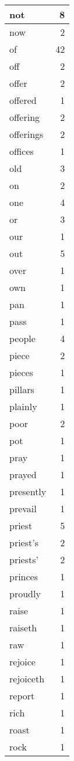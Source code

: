\begin{center}
\begin{longtable}{l|r}
not & 8 \\ \hline
now & 2 \\ \hline
of & 42 \\ \hline
off & 2 \\ \hline
offer & 2 \\ \hline
offered & 1 \\ \hline
offering & 2 \\ \hline
offerings & 2 \\ \hline
offices & 1 \\ \hline
old & 3 \\ \hline
on & 2 \\ \hline
one & 4 \\ \hline
or & 3 \\ \hline
our & 1 \\ \hline
out & 5 \\ \hline
over & 1 \\ \hline
own & 1 \\ \hline
pan & 1 \\ \hline
pass & 1 \\ \hline
people & 4 \\ \hline
piece & 2 \\ \hline
pieces & 1 \\ \hline
pillars & 1 \\ \hline
plainly & 1 \\ \hline
poor & 2 \\ \hline
pot & 1 \\ \hline
pray & 1 \\ \hline
prayed & 1 \\ \hline
presently & 1 \\ \hline
prevail & 1 \\ \hline
priest & 5 \\ \hline
priest's & 2 \\ \hline
priests' & 2 \\ \hline
princes & 1 \\ \hline
proudly & 1 \\ \hline
raise & 1 \\ \hline
raiseth & 1 \\ \hline
raw & 1 \\ \hline
rejoice & 1 \\ \hline
rejoiceth & 1 \\ \hline
report & 1 \\ \hline
rich & 1 \\ \hline
roast & 1 \\ \hline
rock & 1 \\ \hline

\end{longtable}
\end{center}
